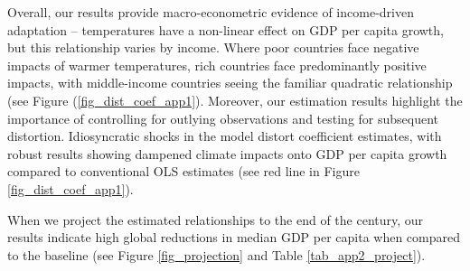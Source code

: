 \documentclass[11pt, letterpaper]{article}
\numberwithin{algorithm}{section}
\numberwithin{assumption}{section}
\numberwithin{lemma}{section}
\numberwithin{theorem}{section}
\numberwithin{corollary}{section}
\numberwithin{remark}{section}
\numberwithin{equation}{section}
\numberwithin{figure}{section}
\numberwithin{table}{section}
\newcommand{\ignore}[1]{}
\begin{document}
Overall, our results provide macro-econometric evidence of income-driven adaptation -- temperatures have a non-linear effect on GDP per capita growth, but this relationship varies by income. Where poor countries face negative impacts of warmer temperatures, rich countries face predominantly positive impacts, with middle-income countries seeing the familiar quadratic relationship (see Figure (\ref{fig_dist_coef_app1}). Moreover, our estimation results highlight the importance of controlling for outlying observations and testing for subsequent distortion. Idiosyncratic shocks in the model distort coefficient estimates, with robust results showing dampened climate impacts onto GDP per capita growth compared to conventional OLS estimates (see red line in Figure \ref{fig_dist_coef_app1}).


When we project the estimated relationships to the end of the century, our results indicate high global reductions in median GDP per capita when compared to the baseline (see Figure \ref{fig_projection} and Table \ref{tab_app2_project}).

\ignore{Note: Can we show that our residuals produced by IIS are iid normal or at least satisfy either normal, homoscedasticity, or serially independent? Any one of these will help us to defend our paper if referees criticise on our assumptions. In addition, in this case we have a very well specified climate impact model that can pass all the specification tests.}
\end{document}
